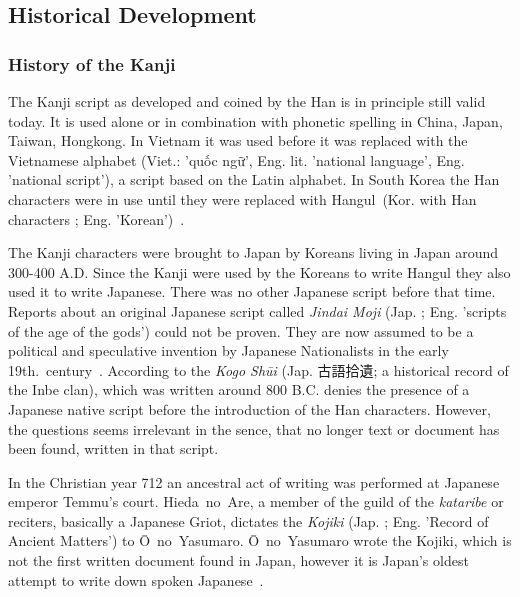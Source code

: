 \subsection{Historical Development}
\label{sec:historicaldevelopmentofjapanesescript}

\subsubsection{History of the Kanji}
\label{sec:historyofthekanji}

The Kanji script as developed and coined by the Han is in principle still valid 
today. It is used alone or in combination with phonetic spelling in China, Japan,
Taiwan, Hongkong. In Vietnam it was used before it was replaced with the 
Vietnamese alphabet (Viet.: 'quốc ngữ', Eng. lit. 'national language', Eng. 
'national script'), a script based on the Latin alphabet. In South Korea the Han 
characters were in use until they were replaced with 
Hangul~(Kor. with Han characters ; Eng. 'Korean')~.

The Kanji characters were brought to Japan by Koreans living in Japan around 
300-400 A.D. Since the Kanji were used by the Koreans to write 
Hangul they also used it to write Japanese. There was no other Japanese script 
before that time. Reports about an original Japanese script called 
\emph{Jindai Moji} (Jap. ; Eng. 'scripts of the age of the gods')
could not be proven. They are now assumed to be a political and speculative 
invention by Japanese Nationalists in the early 
19th.~century~. According to 
the \emph{Kogo Shūi} (Jap. 古語拾遺; a historical record of the Inbe clan),
which was written around 800 B.C. denies the presence of a Japanese native
script before the introduction of the Han characters. However, the questions
seems irrelevant in the sence, that no longer text or document has been found,
written in that script.

In the Christian year 712 an ancestral act of writing was performed at 
Japanese emperor Temmu's court. Hieda~no~Are, a member of the guild of the 
\emph{kataribe} or reciters, basically a Japanese Griot, dictates the 
\emph{Kojiki} (Jap. ; Eng. 'Record of Ancient Matters') to 
Ō~no~Yasumaro. Ō~no~Yasumaro wrote the Kojiki, which is not the first written 
document found in Japan, however it is Japan's oldest attempt to write down 
spoken Japanese~.

